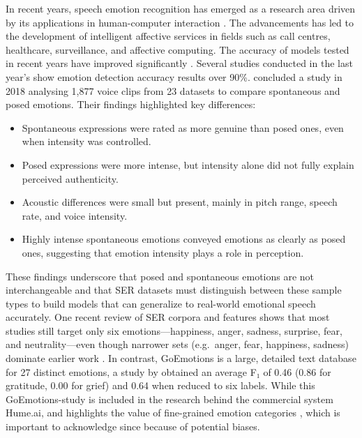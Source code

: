 In recent years, speech emotion recognition has emerged as a research area driven by its applications in human-computer interaction \autocite{Zhang2021}. The advancements has led to the development of intelligent affective services in fields such as call centres, healthcare, surveillance, and affective computing. The accuracy of models tested in recent years have improved significantly \autocite{Adebiyi2024, Praseetha2022, Rahman2024}.  Several studies conducted in the last year’s show emotion detection accuracy results over 90\%. 
\textcite{Juslin2018} concluded a study in 2018 analysing 1,877 voice clips from 23 datasets to compare spontaneous and posed emotions. Their findings highlighted key differences: 
\begin{itemize}
    \item Spontaneous expressions were rated as more genuine than posed ones, even when intensity was controlled. 
    \item Posed expressions were more intense, but intensity alone did not fully explain perceived authenticity. 
    \item Acoustic differences were small but present, mainly in pitch range, speech rate, and voice intensity. 
    \item Highly intense spontaneous emotions conveyed emotions as clearly as posed ones, suggesting that emotion intensity plays a role in perception. 
\end{itemize}
These findings underscore that posed and spontaneous emotions are not interchangeable and that SER datasets must distinguish between these sample types to build models that can generalize to real-world emotional speech accurately.  
One recent review of SER corpora and features \autocite{Rathi2024} shows that most studies still target only six emotions—happiness, anger, sadness, surprise, fear, and neutrality—even though narrower sets (e.g.\ anger, fear, happiness, sadness) dominate earlier work \autocite{Scherer2018}. In contrast, GoEmotions is a large, detailed text database for 27 distinct emotions, a study by \textcite{Demszky2020} obtained an average F₁ of 0.46 (0.86 for gratitude, 0.00 for grief) and 0.64 when reduced to six labels. While this GoEmotions-study is included in the research behind the commercial system Hume.ai, and highlights the value of fine-grained emotion categories \autocite{HumeAI-AboutHume}, which is important to acknowledge since because of potential biases.  

